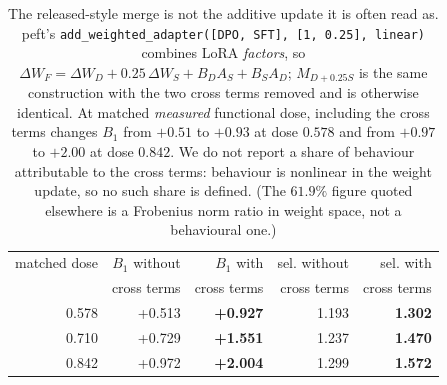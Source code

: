 \begin{table}[!ht]
\centering
\small
\begin{tabular}{rrrrr}
\toprule
matched dose & $B_1$ without & $B_1$ with & sel. without & sel. with \\
 & cross terms & cross terms & cross terms & cross terms \\
\midrule
0.578 & +0.513 & \textbf{+0.927} & 1.193 & \textbf{1.302} \\
0.710 & +0.729 & \textbf{+1.551} & 1.237 & \textbf{1.470} \\
0.842 & +0.972 & \textbf{+2.004} & 1.299 & \textbf{1.572} \\
\bottomrule
\end{tabular}
\caption{The released-style merge is not the additive update it is often read as. peft's \texttt{add\_weighted\_adapter([DPO, SFT], [1, 0.25], \texttt{linear})} combines LoRA \emph{factors}, so $\Delta W_F = \Delta W_D + 0.25\,\Delta W_S + B_D A_S + B_S A_D$; $M_{D+0.25S}$ is the same construction with the two cross terms removed and is otherwise identical. At matched \emph{measured} functional dose, including the cross terms changes $B_1$ from $+0.51$ to $+0.93$ at dose $0.578$ and from $+0.97$ to $+2.00$ at dose $0.842$. We do not report a share of behaviour attributable to the cross terms: behaviour is nonlinear in the weight update, so no such share is defined. (The $61.9\%$ figure quoted elsewhere is a Frobenius norm ratio in weight space, not a behavioural one.)}
\label{tab:oct-peft-merge}
\end{table}
